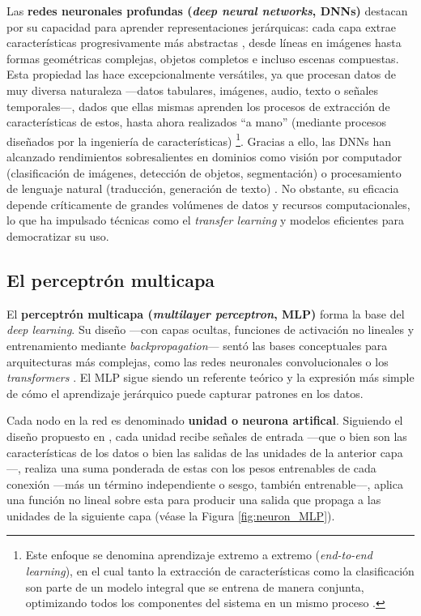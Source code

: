 Las \textbf{redes neuronales profundas (\textit{deep neural networks}, DNNs)} destacan por su capacidad para 
aprender representaciones jerárquicas: cada capa extrae características progresivamente más abstractas 
\cite{lecun2015}, desde líneas en imágenes hasta formas geométricas complejas, objetos completos e incluso 
escenas compuestas.
Esta propiedad las hace excepcionalmente versátiles, ya que procesan datos de muy diversa naturaleza ---datos 
tabulares, imágenes, audio, texto o señales temporales---, dados que ellas mismas aprenden los procesos de 
extracción de características de estos, hasta ahora realizados ``a mano'' (mediante procesos diseñados por la 
ingeniería de características) \cite{rusell2021} 
\footnote{
    Este enfoque se denomina aprendizaje extremo a extremo (\textit{end-to-end learning}), en el cual tanto la 
    extracción de características como la clasificación son parte de un modelo integral que se entrena de 
    manera conjunta, optimizando todos los componentes del sistema en un mismo proceso \cite{rusell2021}.
}. 
Gracias a ello, las DNNs han alcanzado rendimientos sobresalientes en dominios como visión por computador 
(clasificación de imágenes, detección de objetos, segmentación) o procesamiento de lenguaje natural 
(traducción, generación de texto) \cite{redhat2024DeepLearningDefinition}.
No obstante, su eficacia depende críticamente de grandes volúmenes de datos y recursos computacionales, lo que 
ha impulsado técnicas como el \textit{transfer learning} y modelos eficientes para democratizar su uso.


\subsection{El perceptrón multicapa}

El \textbf{perceptrón multicapa (\textit{multilayer perceptron}, MLP)} forma la base del \textit{deep 
learning}. Su diseño ---con capas ocultas, funciones de activación no lineales y entrenamiento  mediante 
\textit{backpropagation}--- sentó las bases conceptuales para arquitecturas más complejas, como las redes 
neuronales convolucionales o los \textit{transformers} \cite{murphy2022}. El MLP sigue siendo un referente 
teórico y la expresión más simple de cómo el aprendizaje jerárquico puede capturar patrones en los datos. 

Cada nodo en la red es denominado \textbf{unidad o neurona artifical}. Siguiendo el diseño propuesto en 
\cite{mcculloch1943,rosenblatt1958}, cada unidad recibe señales de entrada ---que o bien son las 
características de los datos o bien las salidas de las unidades de la anterior capa---, realiza una suma 
ponderada de estas con los pesos entrenables de cada conexión ---más un término independiente o sesgo, también 
entrenable---, aplica una función no lineal sobre esta para producir una salida que propaga a las unidades de 
la siguiente capa (véase la Figura \ref{fig:neuron_MLP}).

